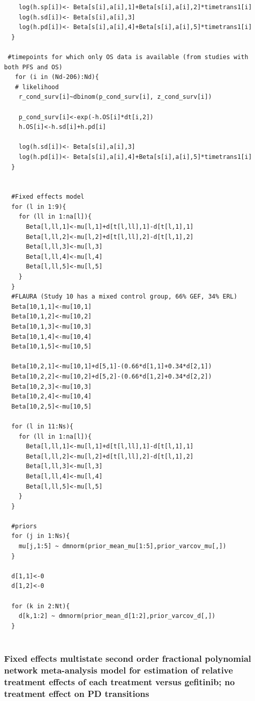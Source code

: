 \documentclass[11pt,final,fleqn]{article}\usepackage[]{graphicx}\usepackage[]{color}
\theoremstyle{plain}
\begin{document}
\begin{appendices}
\begin{verbatim}
    log(h.sp[i])<- Beta[s[i],a[i],1]+Beta[s[i],a[i],2]*timetrans1[i] 
    log(h.sd[i])<- Beta[s[i],a[i],3] 
    log(h.pd[i])<- Beta[s[i],a[i],4]+Beta[s[i],a[i],5]*timetrans1[i]
  }
  
 #timepoints for which only OS data is available (from studies with both PFS and OS)
   for (i in (Nd-206):Nd){
   # likelihood
    r_cond_surv[i]~dbinom(p_cond_surv[i], z_cond_surv[i]) 
    
    p_cond_surv[i]<-exp(-h.OS[i]*dt[i,2])
    h.OS[i]<-h.sd[i]+h.pd[i]
    
    log(h.sd[i])<- Beta[s[i],a[i],3] 
    log(h.pd[i])<- Beta[s[i],a[i],4]+Beta[s[i],a[i],5]*timetrans1[i]
  }
    
 
  #Fixed effects model
  for (l in 1:9){
    for (ll in 1:na[l]){
      Beta[l,ll,1]<-mu[l,1]+d[t[l,ll],1]-d[t[l,1],1]
      Beta[l,ll,2]<-mu[l,2]+d[t[l,ll],2]-d[t[l,1],2]
      Beta[l,ll,3]<-mu[l,3]
      Beta[l,ll,4]<-mu[l,4]
      Beta[l,ll,5]<-mu[l,5]
    }
  }
  #FLAURA (Study 10 has a mixed control group, 66% GEF, 34% ERL)
  Beta[10,1,1]<-mu[10,1]
  Beta[10,1,2]<-mu[10,2]
  Beta[10,1,3]<-mu[10,3]
  Beta[10,1,4]<-mu[10,4]
  Beta[10,1,5]<-mu[10,5]
  
  Beta[10,2,1]<-mu[10,1]+d[5,1]-(0.66*d[1,1]+0.34*d[2,1])
  Beta[10,2,2]<-mu[10,2]+d[5,2]-(0.66*d[1,2]+0.34*d[2,2])
  Beta[10,2,3]<-mu[10,3]
  Beta[10,2,4]<-mu[10,4]
  Beta[10,2,5]<-mu[10,5]
  
  for (l in 11:Ns){
    for (ll in 1:na[l]){
      Beta[l,ll,1]<-mu[l,1]+d[t[l,ll],1]-d[t[l,1],1]
      Beta[l,ll,2]<-mu[l,2]+d[t[l,ll],2]-d[t[l,1],2]
      Beta[l,ll,3]<-mu[l,3]
      Beta[l,ll,4]<-mu[l,4]
      Beta[l,ll,5]<-mu[l,5]
    }
  }
  
  #priors
  for (j in 1:Ns){
    mu[j,1:5] ~ dmnorm(prior_mean_mu[1:5],prior_varcov_mu[,]) 
  }
  
  d[1,1]<-0
  d[1,2]<-0

  for (k in 2:Nt){
    d[k,1:2] ~ dmnorm(prior_mean_d[1:2],prior_varcov_d[,]) 
  }
  
  \end{verbatim}


\subsubsection{Fixed effects multistate second order fractional polynomial network meta-analysis model for estimation of relative treatment effects of each treatment versus gefitinib; no treatment effect on PD transitions}
\begin{verbatim} 


\end{verbatim}
\end{appendices}
\end{document}
